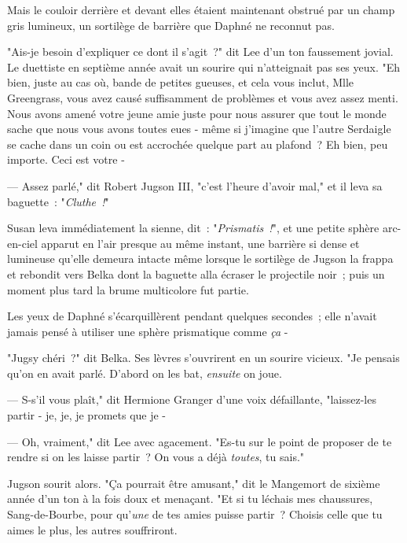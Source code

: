 Mais le couloir derrière et devant elles étaient maintenant obstrué par un champ gris lumineux, un sortilège de barrière que Daphné ne reconnut pas.

"Ais-je besoin d'expliquer ce dont il s'agit~?" dit Lee d'un ton faussement jovial. Le duettiste en septième année avait un sourire qui n'atteignait pas ses yeux. "Eh bien, juste au cas où, bande de petites gueuses, et cela vous inclut, Mlle Greengrass, vous avez causé suffisamment de problèmes et vous avez assez menti. Nous avons amené votre jeune amie juste pour nous assurer que tout le monde sache que nous vous avons toutes eues - même si j'imagine que l'autre Serdaigle se cache dans un coin ou est accrochée quelque part au plafond~? Eh bien, peu importe. Ceci est votre -

--- Assez parlé," dit Robert Jugson III, "c'est l'heure d'avoir mal," et il leva sa baguette~: "\emph{Cluthe~!}"

Susan leva immédiatement la sienne, dit~: "\emph{Prismatis~!}", et une petite sphère arc-en-ciel apparut en l'air presque au même instant, une barrière si dense et lumineuse qu'elle demeura intacte même lorsque le sortilège de Jugson la frappa et rebondit vers Belka dont la baguette alla écraser le projectile noir~; puis un moment plus tard la brume multicolore fut partie.

Les yeux de Daphné s'écarquillèrent pendant quelques secondes~; elle n'avait jamais pensé à utiliser une sphère prismatique comme \emph{ça} -

"Jugsy chéri~?" dit Belka. Ses lèvres s'ouvrirent en un sourire vicieux. "Je pensais qu'on en avait parlé. D'abord on les bat, \emph{ensuite} on joue.

--- S-s'il vous plaît," dit Hermione Granger d'une voix défaillante, "laissez-les partir - je, je, je promets que je -

--- Oh, vraiment," dit Lee avec agacement. "Es-tu sur le point de proposer de te rendre si on les laisse partir~? On vous a déjà \emph{toutes}, tu sais."

Jugson sourit alors. "Ça pourrait être amusant," dit le Mangemort de sixième année d'un ton à la fois doux et menaçant. "Et si tu léchais mes chaussures, Sang-de-Bourbe, pour qu'\emph{une} de tes amies puisse partir~? Choisis celle que tu aimes le plus, les autres souffriront.


